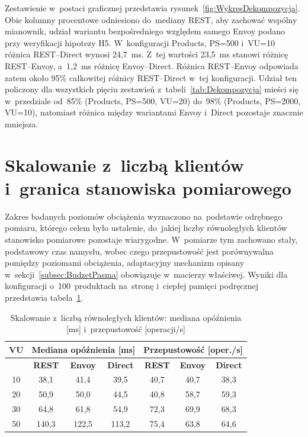 Zestawienie w~postaci graficznej przedstawia rysunek~\ref{fig:WykresDekompozycja}. Obie kolumny procentowe odniesiono do~mediany REST, aby zachować wspólny mianownik, udział wariantu bezpośredniego względem samego Envoy podano przy weryfikacji hipotezy H5. W~konfiguracji Products, PS=500 i~VU=10 różnica REST--Direct wynosi 24,7~ms. Z~tej wartości 23,5~ms stanowi różnicę REST--Envoy, a~1,2~ms różnicę Envoy--Direct. Różnica REST--Envoy odpowiada zatem około 95\% całkowitej różnicy REST--Direct w~tej konfiguracji. Udział ten policzony dla wszystkich pięciu zestawień z~tabeli~\ref{tab:Dekompozycja} mieści się w~przedziale od~85\% (Products, PS=500, VU=20) do~98\% (Products, PS=2000, VU=10), natomiast różnica między wariantami Envoy i~Direct pozostaje znacznie mniejsza.

\section{Skalowanie z~liczbą klientów i~granica stanowiska pomiarowego}
\label{sec:GranicaNarzedzia}

Zakres badanych poziomów obciążenia wyznaczono na~podstawie odrębnego pomiaru, którego celem było ustalenie, do~jakiej liczby równoległych klientów stanowisko pomiarowe pozostaje wiarygodne. W~pomiarze tym zachowano stały, podstawowy czas namysłu, wobec czego przepustowość jest porównywalna pomiędzy poziomami obciążenia, adaptacyjny mechanizm opisany w~sekcji~\ref{subsec:BudzetPasma} obowiązuje w~macierzy właściwej. Wyniki dla konfiguracji o~100~produktach na~stronę i~ciepłej pamięci podręcznej przedstawia tabela~\ref{tab:Skalowanie}.

\begin{table}[htb]
\centering
\footnotesize
\caption{Skalowanie z~liczbą równoległych klientów: mediana opóźnienia [ms] i~przepustowość [operacji/s]}
\label{tab:Skalowanie}
\begin{tabular}{|c|c|c|c|c|c|c|}
\hline
\textbf{VU} & \multicolumn{3}{c|}{\textbf{Mediana opóźnienia [ms]}} & \multicolumn{3}{c|}{\textbf{Przepustowość [oper./s]}} \\
\hline
 & \textbf{REST} & \textbf{Envoy} & \textbf{Direct} & \textbf{REST} & \textbf{Envoy} & \textbf{Direct} \\
\hline
10 & 38,1  & 41,4  & 39,5  & 40,7 & 40,7 & 38,3 \\
20 & 50,9  & 50,0  & 44,5  & 40,8 & 58,7 & 59,3 \\
30 & 64,8  & 61,8  & 54,9  & 72,3 & 69,9 & 68,3 \\
50 & 140,3 & 122,5 & 113,2 & 75,4 & 63,8 & 64,6 \\
\hline
\end{tabular}
\end{table}


